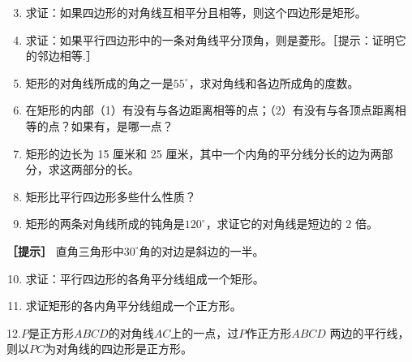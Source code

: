 \begin{enumerate}
\setcounter{enumi}{2}
\item
  求证：如果四边形的对角线互相平分且相等，则这个四边形是矩形。
\item
  求证：如果平行四边形中的一条对角线平分顶角，则是菱形。［提示：证明它的邻边相等.］
\item
  矩形的对角线所成的角之一是\(55^{\circ}\)，求对角线和各边所成角的度数。
\item
  在矩形的内部（1）有没有与各边距离相等的点；（2）有没有与各顶点距离相等的点？如果有，是哪一点？
\item
  矩形的边长为 15 厘米和 25
  厘米，其中一个内角的平分线分长的边为两部分，求这两部分的长。
\item
  矩形比平行四边形多些什么性质？
\item
  矩形的两条对角线所成的钝角是\(120^{\circ}\)，求证它的对角线是短边的 2
  倍。
\end{enumerate}

\textbf{［提示］} 直角三角形中\(30^{\circ}\)角的对边是斜边的一半。

\begin{enumerate}
\setcounter{enumi}{9}
\item
  求证：平行四边形的各角平分线组成一个矩形。
\item
  求证矩形的各内角平分线组成一个正方形。
\end{enumerate}

12.\(P\)是正方形\(ABCD\)的对角线\(AC\)上的一点，过\(P\)作正方形\(ABCD\)
两边的平行线，则以\(PC\)为对角线的四边形是正方形。

